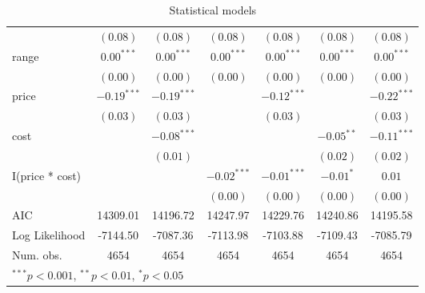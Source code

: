 \begin{table}
\begin{center}
\begin{tabular}{l c c c c c c }
                & $(0.08)$      & $(0.08)$      & $(0.08)$      & $(0.08)$      & $(0.08)$      & $(0.08)$      \\
range           & $0.00^{***}$  & $0.00^{***}$  & $0.00^{***}$  & $0.00^{***}$  & $0.00^{***}$  & $0.00^{***}$  \\
                & $(0.00)$      & $(0.00)$      & $(0.00)$      & $(0.00)$      & $(0.00)$      & $(0.00)$      \\
price           & $-0.19^{***}$ & $-0.19^{***}$ &               & $-0.12^{***}$ &               & $-0.22^{***}$ \\
                & $(0.03)$      & $(0.03)$      &               & $(0.03)$      &               & $(0.03)$      \\
cost            &               & $-0.08^{***}$ &               &               & $-0.05^{**}$  & $-0.11^{***}$ \\
                &               & $(0.01)$      &               &               & $(0.02)$      & $(0.02)$      \\
I(price * cost) &               &               & $-0.02^{***}$ & $-0.01^{***}$ & $-0.01^{*}$   & $0.01$        \\
                &               &               & $(0.00)$      & $(0.00)$      & $(0.00)$      & $(0.00)$      \\
\hline
AIC             & 14309.01      & 14196.72      & 14247.97      & 14229.76      & 14240.86      & 14195.58      \\
Log Likelihood  & -7144.50      & -7087.36      & -7113.98      & -7103.88      & -7109.43      & -7085.79      \\
Num. obs.       & 4654          & 4654          & 4654          & 4654          & 4654          & 4654          \\
\hline
\multicolumn{7}{l}{\scriptsize{$^{***}p<0.001$, $^{**}p<0.01$, $^*p<0.05$}}
\end{tabular}
\caption{Statistical models}
\label{table:coefficients}
\end{center}
\end{table}
